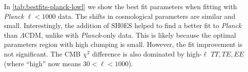 In \cref{tab:bestfits-planck-lowl} we show the best fit parameters when fitting with {\it Planck} $\ell<1000$ data.
The shifts in cosmological parameters are similar and small.
Interestingly, the addition of SH0ES helped to find a better fit to {\it Planck} than $\Lambda$CDM, unlike with {\it Planck}-only data.
This is likely because the optimal parameters region with high clumping is small.
However, the fit improvement is not significant.
The CMB $\chi^2$ difference is also dominated by high-$\ell$ $TT,TE,EE$ (where ``high'' now means $30<\ell<1000$).